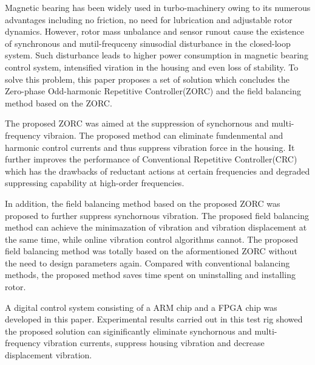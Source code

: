 \begin{abstractEn}
Magnetic bearing has been widely used in turbo-machinery owing to its numerous advantages including no friction, no need for lubrication and adjustable rotor dynamics. However, rotor mass unbalance and sensor runout cause the existence of synchronous and mutil-frequceny sinusodial disturbance in the closed-loop system. Such disturbance leads to higher power consumption in magnetic bearing control system, intensified viration in the housing and even loss of stability. To solve this problem, this paper proposes a set of solution which concludes the Zero-phase Odd-harmonic Repetitive Controller(ZORC) and the field balancing method based on the ZORC. 

The proposed ZORC was aimed at the suppression of synchornous and multi-frequency vibraion. The proposed method can eliminate fundenmental and harmonic control currents and thus suppress vibration force in the housing. It further improves the performance of Conventional Repetitive Controller(CRC) which has the drawbacks of reductant actions at certain frequencies and degraded suppressing capability at high-order frequencies.

In addition, the field balancing method based on the proposed ZORC was proposed to further suppress synchornous vibration. The proposed field balancing method can achieve the minimazation of vibration and vibration displacement at the same time, while online vibration control algorithms cannot. The proposed field balancing method was totally based on the aformentioned ZORC without the need to design parameters again. Compared with conventional balancing methods, the proposed method saves time spent on uninstalling and installing rotor.

A digital control system consisting of a ARM chip and a FPGA chip was developed in this paper. Experimental results carried out in this test rig showed the proposed solution can siginificantly eliminate synchornous and multi-frequency vibration currents, suppress housing vibration and decrease displacement vibration.

\end{abstractEn}



\usepackage{subfig}
\usepackage{rotating}
\usepackage[usenames,dvipsnames]{xcolor}
\usepackage{tikz}
\usepackage{pgfplots}
\pgfplotsset{compat=1.16}
\usepackage{ifthen}
\usepackage{longtable}
\usepackage{siunitx}
\usepackage{listings}
\usepackage{multirow}
\usepackage[bottom]{footmisc}
\usepackage{pifont}

